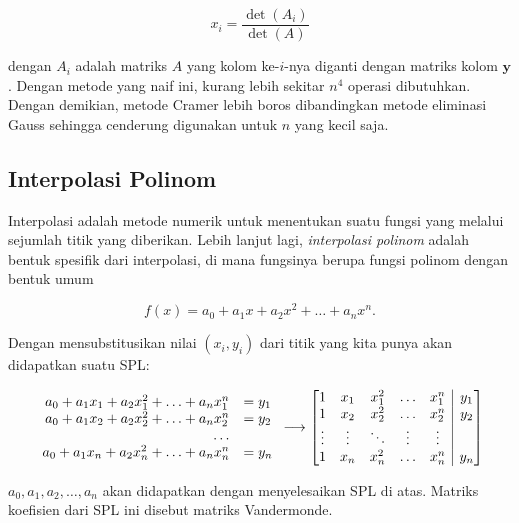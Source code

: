 
\[ x_i = \frac{\det(A_i)}{\det(A)} \]

dengan $A_i$ adalah matriks $A$ yang kolom ke-$i$-nya diganti dengan matriks kolom $\textbf{y}$. Dengan metode yang naif ini, kurang lebih sekitar $n^4$ operasi dibutuhkan. Dengan demikian, metode Cramer lebih boros dibandingkan metode eliminasi Gauss sehingga cenderung digunakan untuk $n$ yang kecil saja.

\subsection{Interpolasi Polinom}

Interpolasi adalah metode numerik untuk menentukan suatu fungsi yang melalui sejumlah titik yang diberikan. Lebih lanjut lagi, \textit{interpolasi polinom} adalah bentuk spesifik dari interpolasi, di mana fungsinya berupa fungsi polinom dengan bentuk umum

\[ f(x) = a_0 + a_1 x + a_2 x^2 + \ldots + a_n x^n. \]

Dengan mensubstitusikan nilai $(x_i, y_i)$ dari titik yang kita punya akan didapatkan suatu SPL:

\begin{align*}
    \begin{array}{rl}
    a_0 + a_1 x_1 + a_2 x_1^2 + \ldots + a_n x_1^n &= y_1 \\
    a_0 + a_1 x_2 + a_2 x_2^2 + \ldots + a_n x_2^n &= y_2 \\
    \ldots \\
    a_0 + a_1 x_n + a_2 x_n^2 + \ldots + a_n x_n^n &= y_n
    \end{array} \longrightarrow
    \left[\begin{array}{@{}ccccc|c@{}}
1       & x_1 & x_1^2   & \ldots & x_1^n  & y_1         \\
1       & x_2 & x_2^2   & \ldots & x_2^n  & y_2         \\
\vdots  & \vdots        & \ddots & \vdots & \vdots      \\
1       & x_n           & x_n^2  & \ldots & x_n^n & y_n 
\end{array}\right]
\end{align*}

$a_0, a_1, a_2, \ldots, a_n$ akan didapatkan dengan menyelesaikan SPL di atas. Matriks koefisien dari SPL ini disebut matriks Vandermonde.


